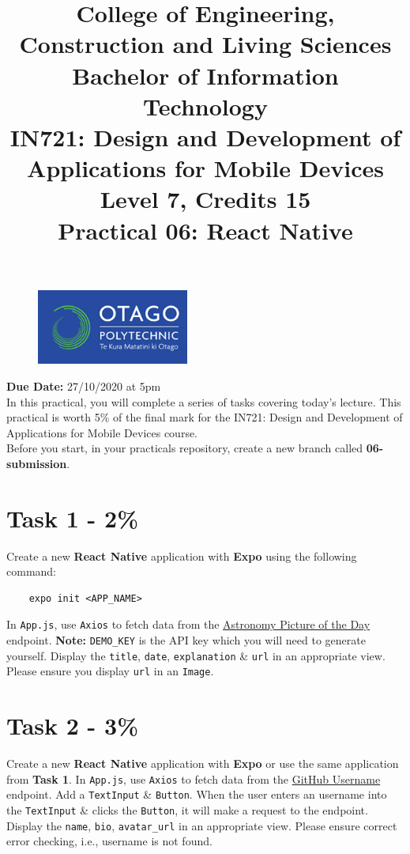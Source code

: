 \documentclass{article}
\author{}
\begin{document}
\begin{figure}
    \centering
    \includegraphics[width=50mm]{img/logo.png}
\end{figure}

\title{College of Engineering, Construction and Living Sciences\\Bachelor of Information Technology\\IN721: Design and Development of Applications for Mobile Devices\\Level 7, Credits 15\\\textbf{Practical 06: React Native}}
\date{}
\maketitle

\textbf{Due Date:} 27/10/2020 at 5pm \\

In this practical, you will complete a series of tasks covering today's lecture. This practical is worth 5\% of the final mark for the IN721: Design and Development of Applications for Mobile Devices course. \\

Before you start, in your practicals repository, create a new branch called \textbf{06-submission}. 

\section*{Task 1 - 2\%} 
Create a new \textbf{React Native} application with \textbf{Expo} using the following command:
\begin{verbatim}
    expo init <APP_NAME>
\end{verbatim}

In \texttt{App.js}, use \texttt{Axios} to fetch data from the \href{https://api.nasa.gov/planetary/apod?api\_key=DEMO\_KEY}{Astronomy Picture of the Day} endpoint. \textbf{Note:} \texttt{DEMO\_KEY} is the API key which you will need to generate yourself. Display the \texttt{title}, \texttt{date}, \texttt{explanation} \& \texttt{url} in an appropriate view. Please ensure you display \texttt{url} in an \texttt{Image}.

\section*{Task 2 - 3\%} 
Create a new \textbf{React Native} application with \textbf{Expo}  or use the same application from \textbf{Task 1}. In \texttt{App.js}, use \texttt{Axios} to fetch data from the \href{https://api.github.com/users/GITHUB\_USERNAME}{GitHub Username} endpoint. Add a \texttt{TextInput} \& \texttt{Button}. When the user enters an username into the \texttt{TextInput} \& clicks the \texttt{Button}, it will make a request to the endpoint. Display the \texttt{name}, \texttt{bio}, \texttt{avatar\_url} in an appropriate view. Please ensure correct error checking, i.e., username is not found.
\end{document}

